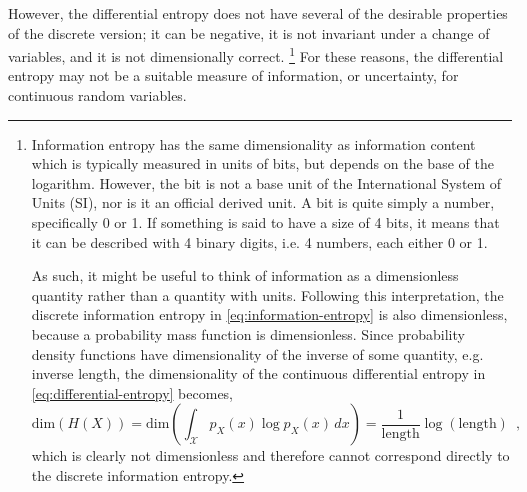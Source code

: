 However, the differential entropy does not have several of the desirable properties of the discrete version; it can be negative, it is not invariant under a change of variables, and it is not dimensionally correct.%
\footnote{\label{fn:dimensional-analysis-of-differential-entropy}
    Information entropy has the same dimensionality as information content which is typically measured in units of bits, but depends on the base of the logarithm. 
    However, the bit is not a base unit of the International System of Units (SI), nor is it an official derived unit.
    A bit is quite simply a number, specifically 0 or 1. If something is said to have a size of 4 bits, it means that it can be described with 4 binary digits, i.e. 4 numbers, each either 0 or 1.

    As such, it might be useful to think of information as a dimensionless quantity rather than a quantity with units.
    Following this interpretation, the discrete information entropy in \cref{eq:information-entropy} is also dimensionless, because a probability mass function is dimensionless. 
    Since probability density functions have dimensionality of the inverse of some quantity, e.g. inverse length, the dimensionality of the continuous differential entropy in \cref{eq:differential-entropy} becomes,
    \begin{equation*}
        \text{dim} \left( H(X) \right) = \text{dim} \left( \int_{\mathcal{X}} p_X(x) \log p_X(x) \, dx \right) = \frac{1}{\text{length}} \log\left(\text{length}\right) \enspace ,
    \end{equation*}
    which is clearly not dimensionless and therefore cannot correspond directly to the discrete information entropy.
} 
For these reasons, the differential entropy may not be a suitable measure of information, or uncertainty, for continuous random variables. 

